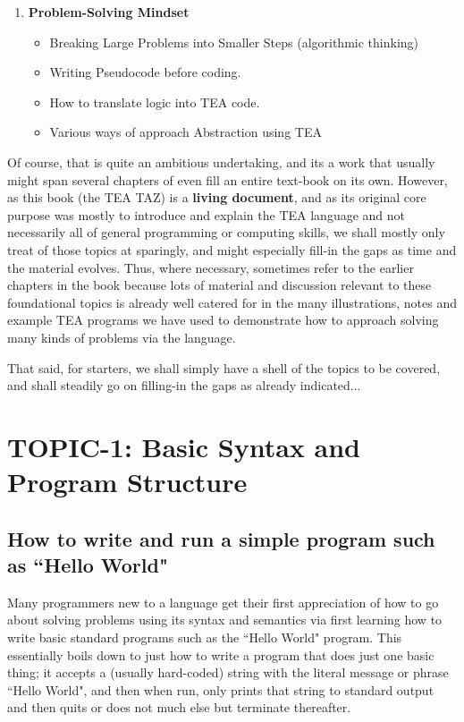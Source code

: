 \documentclass[a4paper, 18pt]{book} %
\begin{document}
{{{\begin{appendices}
\begin{enumerate}
\item{\textbf{Problem-Solving Mindset}
\begin{itemize}
\item Breaking Large Problems into Smaller Steps (algorithmic thinking)
\item Writing Pseudocode before coding.
\item How to translate logic into TEA code.
\item Various ways of approach Abstraction using TEA
\end{itemize}
}

\end{enumerate}


\vspace{2em}

Of course, that is quite an ambitious undertaking, and its a work that usually might span several chapters of even fill an entire text-book on its own. However, as this book (the TEA TAZ) is a \textbf{living document}, and as its original core purpose was mostly to introduce and explain the TEA language and not necessarily all of general programming or computing skills, we shall mostly only treat of those topics at sparingly, and might especially fill-in the gaps as time and the material evolves. Thus, where necessary, sometimes refer to the earlier chapters in the book because lots of material and discussion relevant to these foundational topics is already well catered for in the many illustrations, notes and example TEA programs we have used to demonstrate how to approach solving many kinds of problems via the language.

\vspace{2em}

That said, for starters, we shall simply have a shell of the topics to be covered, and shall steadily go on filling-in the gaps as already indicated...



\section{TOPIC-1: Basic Syntax and Program Structure}

\subsection{How to write and run a simple program such as ``Hello World"}

Many programmers new to a language get their first appreciation of how to go about solving problems using its syntax and semantics via first learning how to write basic standard programs such as the ``Hello World" program. This essentially boils down to just how to write a program that does just one basic thing; it accepts a (usually hard-coded) string with the literal message or phrase ``Hello World", and then when run, only prints that string to standard output and then quits or does not much else but terminate thereafter.


\end{appendices}}}}
\end{document}
